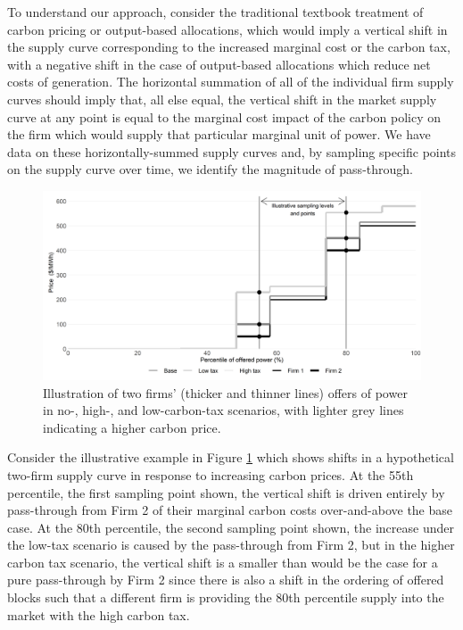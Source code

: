 \documentclass[12pt]{article}
\begin{document}
To understand our approach, consider the traditional textbook treatment of carbon pricing or output-based allocations, which would imply a vertical shift in the supply curve corresponding to the increased marginal cost or the carbon tax, with a negative shift in the case of output-based allocations which reduce net costs of generation. The horizontal summation of all of the individual firm supply curves should imply that, all else equal, the vertical shift in the market supply curve at any point is equal to the marginal cost impact of the carbon policy on the firm which would supply that particular marginal unit of power. We have data on these horizontally-summed supply curves and, by sampling specific points on the supply curve over time, we identify the magnitude of pass-through.

\begin{figure}[t]
    \centering
    \begin{minipage}{\textwidth}
        \centering
        \includegraphics[width=.9\textwidth]{../images/sampling.png}
        \caption{Illustration of two firms' (thicker and thinner lines) offers of power in no-, high-, and low-carbon-tax scenarios, with lighter grey lines indicating a higher carbon price.}
    \label{fig:synth_illust}
    \end{minipage}%
\end{figure}

Consider the illustrative example in Figure \ref{fig:synth_illust} which shows shifts in a hypothetical two-firm supply curve in response to increasing carbon prices. At the 55th percentile, the first sampling point shown, the vertical shift is driven entirely by pass-through from Firm 2 of their marginal carbon costs over-and-above the base case. At the 80th percentile, the second sampling point shown, the increase under the low-tax scenario is caused by the pass-through from Firm 2, but in the higher carbon tax scenario, the vertical shift is a smaller than would be the case for a pure pass-through by Firm 2 since there is also a shift in the ordering of offered blocks such that a different firm is providing the 80th percentile supply into the market with the high carbon tax.
\end{document}
